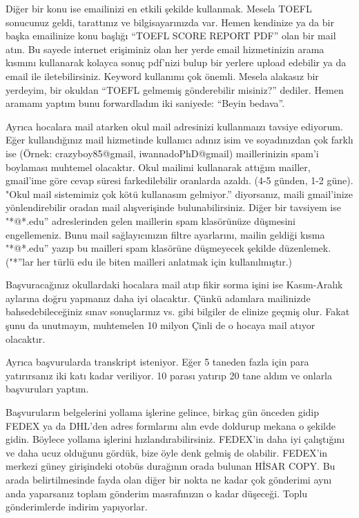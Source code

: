 \documentclass[12pt]{article}
\begin{document}
Diğer bir konu ise emailinizi en etkili şekilde kullanmak. Mesela TOEFL sonucunuz geldi, tarattınız ve bilgisayarınızda var. Hemen kendinize ya da bir başka emailinize konu başlığı ``TOEFL SCORE REPORT PDF'' olan bir mail atın. Bu sayede internet erişiminiz olan her yerde email hizmetinizin arama kısmını kullanarak kolayca sonuç pdf'nizi bulup bir yerlere upload edebilir ya da email ile iletebilirsiniz. Keyword kullanımı çok önemli. Mesela alakasız bir yerdeyim, bir okuldan ``TOEFL gelmemiş gönderebilir misiniz?'' dediler. Hemen aramamı yaptım bunu forwardladım iki saniyede: ``Beyin bedava''. 

Ayrıca hocalara mail atarken okul mail adresinizi kullanmaızı tavsiye ediyorum. Eğer kullandığınız mail hizmetinde kullanıcı adınız isim ve soyadınızdan çok farklı ise (Örnek: crazyboy85@gmail, iwannadoPhD@gmail) maillerinizin spam'i boylaması muhtemel olacaktır. Okul mailimi kullanarak attığım mailler, gmail'ime göre cevap süresi farkedilebilir oranlarda azaldı. (4-5 günden, 1-2 güne). "Okul mail sistemimiz çok kötü kullanasım gelmiyor.'' diyorsanız, maili gmail'inize yönlendirebilir oradan mail alışverişinde bulunabilirsiniz. Diğer bir tavsiyem ise "*@*.edu'' adreslerinden gelen maillerin spam klasörünüze düşmesini engellemeniz. Bunu mail sağlayıcınızın filtre ayarlarını, mailin geldiği kısma "*@*.edu'' yazıp bu mailleri spam klasörüne düşmeyecek şekilde düzenlemek. ("*''lar her türlü edu ile biten mailleri anlatmak için kullanılmıştır.)

Başvuracağınız okullardaki hocalara mail atıp fikir sorma işini ise Kasım-Aralık aylarına doğru yapmanız daha iyi olacaktır. Çünkü adamlara mailinizde bahsedebileceğiniz sınav sonuçlarınız vs. gibi bilgiler de elinize geçmiş olur. Fakat şunu da unutmayın, muhtemelen 10 milyon Çinli de o hocaya mail atıyor olacaktır. 

Ayrıca başvurularda transkript isteniyor. Eğer 5 taneden fazla için para yatırırsanız iki katı kadar veriliyor. 10 parası yatırıp 20 tane aldım ve onlarla başvuruları yaptım.  

Başvuruların belgelerini yollama işlerine gelince, birkaç gün önceden gidip FEDEX ya da DHL'den adres formlarını alın evde doldurup mekana o şekilde gidin. Böylece yollama işlerini hızlandırabilirsiniz. FEDEX'in daha iyi çalıştığını ve daha ucuz olduğunu gördük, bize öyle denk gelmiş de olabilir. FEDEX’in merkezi güney girişindeki otobüs durağının orada bulunan HİSAR COPY. Bu arada belirtilmesinde fayda olan diğer bir nokta ne kadar çok gönderimi aynı anda yaparsanız toplam gönderim masrafınızın o kadar düşeceği. Toplu gönderimlerde indirim yapıyorlar. 
%
%
%
\newpage
\end{document}
